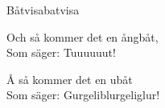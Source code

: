\begin{song}{Båtvisa}{batvisa}
\begin{vers}
Och så kommer det en ångbåt,   \\
Som säger: Tuuuuuut!\\
\end{vers}
\begin{vers}
Å så kommer det en ubåt\\
Som säger: Gurgeliblurgeliglur!\\
\end{vers}
\end{song}
